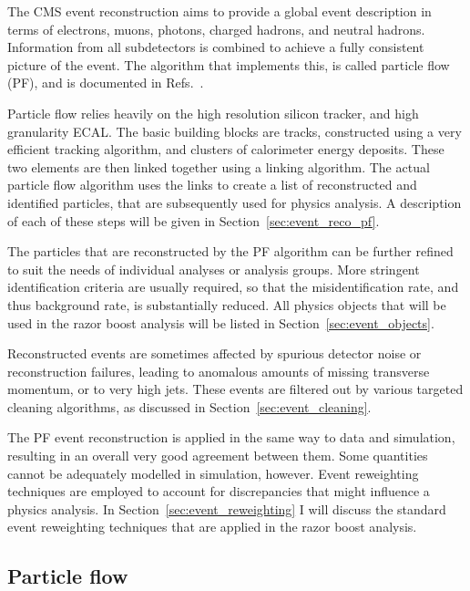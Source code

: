 
The CMS event reconstruction aims to provide a global event description in terms of electrons,
muons, photons, charged hadrons, and neutral hadrons. Information from all subdetectors is combined
to achieve a fully consistent picture of the event. The algorithm that implements this, is called
particle flow (PF), and is documented in Refs.~\cite{CMS-PAS-PFT-09-001,PF}. 

Particle flow relies heavily on the high resolution silicon tracker, and high granularity ECAL. The
basic building blocks are tracks, constructed using a very efficient tracking algorithm, and
clusters of calorimeter energy deposits. 
These two elements are then linked together using a linking algorithm. The actual particle flow
algorithm uses the links to create a list of reconstructed and identified particles, that are
subsequently used for physics analysis. A description of each of these steps will be given in
Section~\ref{sec:event_reco_pf}.

The particles that are reconstructed by the PF algorithm can be further refined to suit the needs
of individual analyses or analysis groups. More stringent identification criteria are usually
required, so that the misidentification rate, and thus background rate, is substantially reduced.
All physics objects that will be used in the razor boost analysis will be listed in
Section~\ref{sec:event_objects}.

Reconstructed events are sometimes affected by spurious detector noise or reconstruction failures,
leading to anomalous amounts of missing transverse momentum, or to very high \pt jets. 
These events are filtered out by various targeted cleaning algorithms, as discussed in
Section~\ref{sec:event_cleaning}.

The PF event reconstruction is applied in the same way to data and simulation, resulting in an
overall very good agreement between them. Some quantities cannot be adequately modelled in
simulation, however. Event reweighting techniques are employed to account for discrepancies that
might influence a physics analysis. In Section~\ref{sec:event_reweighting} I will discuss the
standard event reweighting techniques that are applied in the razor boost analysis. 


\subsection{Particle flow \label{sec:event_reco_pf}}


